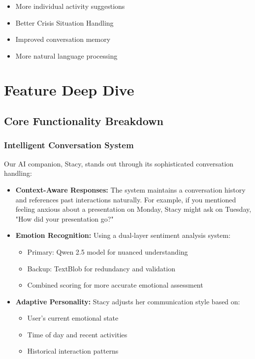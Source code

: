 \documentclass[12pt]{article}
\begin{document}
\begin{itemize}
    \item More individual activity suggestions
    \item Better Crisis Situation Handling
    \item Improved conversation memory
    \item More natural language processing
\end{itemize}

\section{Feature Deep Dive}

\subsection{Core Functionality Breakdown}

\subsubsection{Intelligent Conversation System}
Our AI companion, Stacy, stands out through its sophisticated conversation handling:
\begin{itemize}
    \item \textbf{Context-Aware Responses:} The system maintains a conversation history and references past interactions naturally. For example, if you mentioned feeling anxious about a presentation on Monday, Stacy might ask on Tuesday, "How did your presentation go?"
    
    \item \textbf{Emotion Recognition:} Using a dual-layer sentiment analysis system:
    \begin{itemize}
        \item Primary: Qwen 2.5 model for nuanced understanding
        \item Backup: TextBlob for redundancy and validation
        \item Combined scoring for more accurate emotional assessment
    \end{itemize}
    
    \item \textbf{Adaptive Personality:} Stacy adjusts her communication style based on:
    \begin{itemize}
        \item User's current emotional state
        \item Time of day and recent activities
        \item Historical interaction patterns
    \end{itemize}
\end{itemize}
\end{document}

